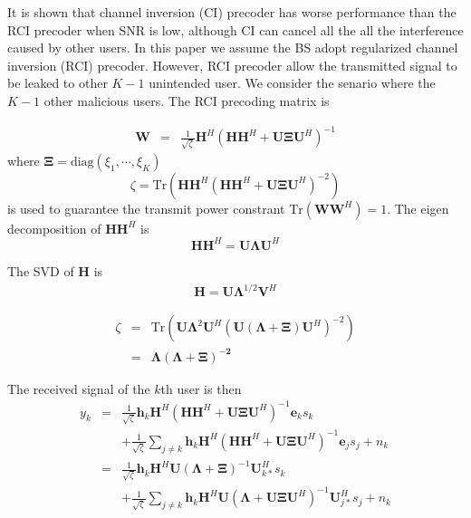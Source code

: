 \documentclass[12pt,journal,draftclsnofoot,onecolumn]{IEEEtran}
\begin{document}
It is shown that channel inversion (CI) precoder has worse performance than the RCI precoder when SNR is low, although CI can cancel all the all the interference caused by other users. In this paper we assume the BS adopt regularized channel inversion (RCI) precoder.  However, RCI precoder allow the transmitted signal to be leaked to other $K-1$ unintended user. We consider the senario where the $K-1$ other malicious users. The RCI precoding matrix is 

\begin{eqnarray}
\mathbf{W} &=& \frac{1}{\sqrt{\zeta}}\mathbf{H}^H\left(\mathbf{H}\mathbf{H}^H + \mathbf{U}\mathbf{\Xi}\mathbf{U}^H\right)^{-1}
\end{eqnarray}
where $\mathbf{\Xi} = \mathrm{diag}(\xi_1,\cdots,\xi_K)$
\begin{equation} \label{eq:zeta}
\zeta = \mathrm{Tr}\left(\mathbf{H}\mathbf{H}^H\left(\mathbf{H}\mathbf{H}^H + \mathbf{U}\mathbf{\Xi}\mathbf{U}^H\right)^{-2}\right)
\end{equation}
is used to guarantee the transmit power constrant $\mathrm{Tr}\left(\mathbf{W}\mathbf{W}^H\right) = 1$. The eigen decomposition of $\mathbf{H}\mathbf{H}^H$ is
\begin{equation}
\mathbf{H}\mathbf{H}^H = \mathbf{U}\mathbf{\Lambda}\mathbf{U}^H
\end{equation}

The SVD of $\mathbf{H}$ is
\begin{eqnarray}
\mathbf{H} = \mathbf{U}\mathbf{\Lambda}^{1/2}\mathbf{V}^H
\end{eqnarray}


\begin{eqnarray} \label{eq:zeta_futher}
\zeta &=& \mathrm{Tr}\left(\mathbf{U}\mathbf{\Lambda}^2\mathbf{U}^H\left(\mathbf{U}\left(\mathbf{\Lambda} + \mathbf{\Xi}\right)\mathbf{U}^H\right)^{-2}\right)\\
&=& \mathbf{\mathbf{\Lambda}\left(\mathbf{\Lambda} + \mathbf{\Xi}\right)^{-2}}
\end{eqnarray}

The received signal of the $k$th user is then
\begin{eqnarray}
y_k 
&=&\frac{1}{\sqrt{\zeta}}\mathbf{h}_k\mathbf{H}^H\left(\mathbf{H}\mathbf{H}^H + \mathbf{U}\mathbf{\Xi}\mathbf{U}^H\right)^{-1}\mathbf{e}_{k}s_k \nonumber \\ 
&&+\frac{1}{\sqrt{\zeta}}\sum_{j \neq k}\mathbf{h}_k\mathbf{H}^H\left(\mathbf{H}\mathbf{H}^H + \mathbf{U}\mathbf{\Xi}\mathbf{U}^{H}\right)^{-1}\mathbf{e}_js_j + n_k\\
 &=&\frac{1}{\sqrt{\zeta}}\mathbf{h}_k\mathbf{H}^H\mathbf{U}\left(\mathbf{\Lambda} + \mathbf{\Xi}\right)^{-1}\mathbf{U}_{k*}^Hs_k \nonumber\\
&&+ \frac{1}{\sqrt{\zeta}}\sum_{j \neq k}\mathbf{h}_k\mathbf{H}^H\mathbf{U}\left(\mathbf{\Lambda} + \mathbf{U}\mathbf{\Xi}\mathbf{U}^H\right)^{-1}\mathbf{U}_{j*}^Hs_j + n_k
\end{eqnarray}
\end{document}
